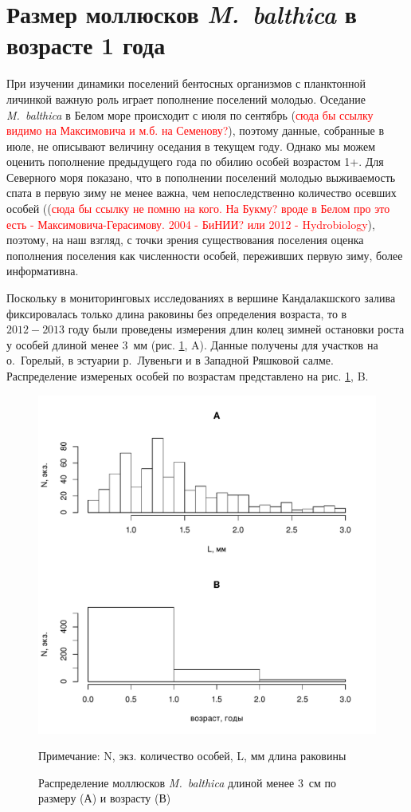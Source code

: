 \documentclass[12pt, a4paper]{disser}
\begin{document}
	\section{Размер моллюсков {\it M.~balthica} в возрасте 1 года}

При изучении динамики поселений бентосных организмов с планктонной личинкой важную роль играет пополнение поселений молодью. 
Оседание {\it M.~balthica} в Белом море происходит с июля по сентябрь (\textcolor{red}{сюда бы ссылку видимо на Максимовича и м.б. на Семенову?}), поэтому данные, собранные в июле, не описывают величину оседания в текущем году. 
Однако мы можем оценить пополнение предыдущего года по обилию особей возрастом 1+. 
Для Северного моря показано, что в пополнении поселений молодью выживаемость спата в первую зиму не менее важна, чем непоследственно количество осевших особей ((\textcolor{red}{сюда бы ссылку не помню на кого. На Букму? вроде в Белом про это есть - Максимовича-Герасимову. 2004 - БиНИИ? или 2012 - Hydrobiology}), поэтому, на наш взгляд, с точки зрения существования поселения оценка пополнения поселения как численности особей, переживших первую зиму, более информативна.

Поскольку в мониторинговых исследованиях в вершине Кандалакшского залива фиксировалась только длина раковины без определения возраста, то в $2012 - 2013$ году были проведены  измерения длин колец зимней остановки роста у особей длиной менее $3$~мм (рис. \ref{ris:vozrast_menee_3mm}, A). 
Данные получены для участков на о.~Горелый, в эстуарии р.~Лувеньги и в Западной Ряшковой салме. 
Распределение измереных особей по возрастам представлено на рис. \ref{ris:vozrast_menee_3mm}, B.
	\begin{figure}
		\includegraphics{../White_Sea/growth_young/hist_obili_po_godam.pdf}
	\caption{Распределение моллюсков {\it M.~balthica} длиной менее $3$~см по размеру (А) и возрасту (В)}
	\label{ris:vozrast_menee_3mm}
	{\footnotesize Примечание: N, экз. \textemdash количество особей, L, мм \textemdash длина раковины}
	\end{figure}
\end{document}
